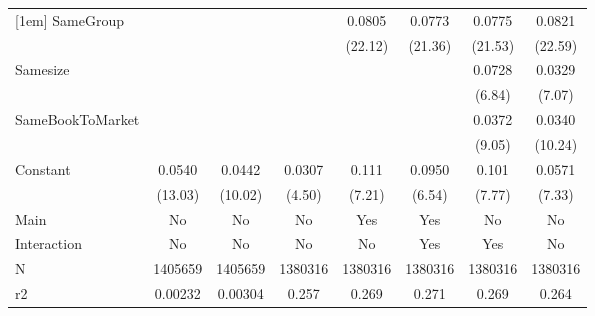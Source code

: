 {\begin{tabular}{l*{7}{c}}
[1em]
SameGroup           &                     &                     &                     &      0.0805\sym{***}&      0.0773\sym{***}&      0.0775\sym{***}&      0.0821\sym{***}\\
                    &                     &                     &                     &     (22.12)         &     (21.36)         &     (21.53)         &     (22.59)         \\
[1em]
Samesize            &                     &                     &                     &                     &                     &      0.0728\sym{***}&      0.0329\sym{***}\\
                    &                     &                     &                     &                     &                     &      (6.84)         &      (7.07)         \\
[1em]
SameBookToMarket    &                     &                     &                     &                     &                     &      0.0372\sym{***}&      0.0340\sym{***}\\
                    &                     &                     &                     &                     &                     &      (9.05)         &     (10.24)         \\
[1em]
Constant            &      0.0540\sym{***}&      0.0442\sym{***}&      0.0307\sym{***}&       0.111\sym{***}&      0.0950\sym{***}&       0.101\sym{***}&      0.0571\sym{***}\\
                    &     (13.03)         &     (10.02)         &      (4.50)         &      (7.21)         &      (6.54)         &      (7.77)         &      (7.33)         \\
\hline
Main                &          No         &          No         &          No         &         Yes         &         Yes         &          No         &          No         \\
Interaction         &          No         &          No         &          No         &          No         &         Yes         &         Yes         &          No         \\
N                   &     1405659         &     1405659         &     1380316         &     1380316         &     1380316         &     1380316         &     1380316         \\
r2                  &     0.00232         &     0.00304         &       0.257         &       0.269         &       0.271         &       0.269         &       0.264         \\

\end{tabular}}
